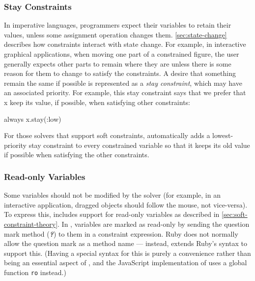 \subsubsection{Stay Constraints}
In imperative languages, programmers expect their variables to retain
their values, unless some assignment operation changes them.
\autoref{sec:state-change} describes how constraints interact with
state change. For example, in interactive graphical applications, when
moving one part of a constrained figure, the user generally expects
other parts to remain where they are unless there is some reason for
them to change to satisfy the constraints.  A desire that something
remain the same if possible is represented as a \emph{stay
  constraint}, which may have an associated priority.  For example,
this stay constraint says that we prefer that x keep its value, if
possible, when satisfying other constraints:
\begin{code}[numbers=none]
always { x.stay(:low) }
\end{code}

For those solvers that support soft constraints, \langname
automatically adds a lowest-priority stay constraint to every
constrained variable so that it keeps its old value if possible when
satisfying the other constraints. \DIFaddbegin {}\DIFaddend %

\subsubsection{Read-only Variables}
Some variables should not be modified by the solver (for example, in
an interactive application, dragged objects should follow the mouse,
not vice-versa). To express this, \langname includes support for
read-only variables as described in
\autoref{sec:soft-constraint-theory}. In \toolname, variables are
marked as read-only by sending the question mark method
({\bfseries\emph{?}}) to them in a constraint expression. Ruby does
not normally allow the question mark as a method name --- instead,
\toolname extends Ruby's syntax to support this. (Having a special
syntax for this is purely a convenience rather than being an essential
aspect of \toolname, and the JavaScript implementation of \langname
\DIFaddbegin {}\DIFaddend uses a global function \lstinline{ro} instead.)

